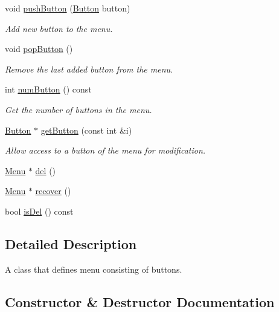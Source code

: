 \begin{DoxyCompactItemize}
void \mbox{\hyperlink{class_menu_aec502b8f392fd6c88078f95522d9b50d}{push\+Button}} (\mbox{\hyperlink{class_button}{Button}} button)
\begin{DoxyCompactList}\small\item\em Add new button to the menu. \end{DoxyCompactList}\item 
void \mbox{\hyperlink{class_menu_a674cd38ddc325b22ec9364e7f83f0b6d}{pop\+Button}} ()
\begin{DoxyCompactList}\small\item\em Remove the last added button from the menu. \end{DoxyCompactList}\item 
int \mbox{\hyperlink{class_menu_aa0878bc89af6cb4b96132966af62b1e0}{num\+Button}} () const
\begin{DoxyCompactList}\small\item\em Get the number of buttons in the menu. \end{DoxyCompactList}\item 
\mbox{\hyperlink{class_button}{Button}} $\ast$ \mbox{\hyperlink{class_menu_a3893d4b249adaadbbaf01501a1410154}{get\+Button}} (const int \&i)
\begin{DoxyCompactList}\small\item\em Allow access to a button of the menu for modification. \end{DoxyCompactList}\item 
\mbox{\hyperlink{class_menu}{Menu}} $\ast$ \mbox{\hyperlink{class_menu_a51548806948f9617dc6b66080eec0ca5}{del}} ()
\item 
\mbox{\hyperlink{class_menu}{Menu}} $\ast$ \mbox{\hyperlink{class_menu_a75a1e9e303a0d8398b6cfc498a92ed48}{recover}} ()
\item 
bool \mbox{\hyperlink{class_menu_a8dd5bf7c984e940e18688fc2d21a7697}{is\+Del}} () const
\end{DoxyCompactItemize}


\subsection{Detailed Description}
A class that defines menu consisting of buttons. 

\subsection{Constructor \& Destructor Documentation}
\mbox{\label{class_menu_abfa6d045971efb18d5a189fdc6ee9847}} 

